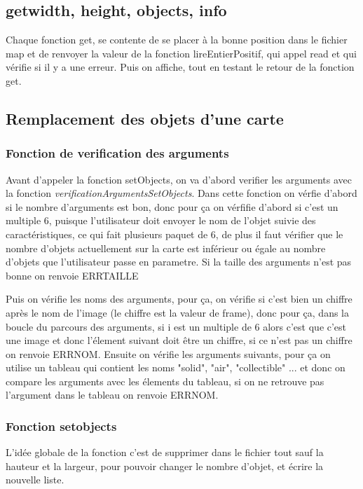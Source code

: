 \documentclass[10pt,a4paper]{article}
\begin{document}
\subsection{getwidth, height, objects, info}
    Chaque fonction get, se contente de se placer à la bonne position dans le fichier map et de renvoyer la valeur de la fonction lireEntierPositif, qui appel read et qui vérifie si il y a une erreur. Puis on affiche, tout en testant le retour de la fonction get. 
\subsection{Remplacement des objets d'une carte}
        \subsubsection{Fonction de verification des arguments}
            Avant d'appeler la fonction setObjects, on va d'abord verifier les arguments avec la fonction \textit{verificationArgumentsSetObjects}.
            Dans cette fonction on vérfie d'abord si le nombre d'arguments est bon, donc pour ça on vérfifie d'abord si c'est un multiple 6, puisque l'utilisateur doit envoyer le nom de l'objet suivie des caractéristiques, ce qui fait plusieurs paquet de 6, de plus il faut vérifier que le nombre d'objets actuellement sur la carte est inférieur ou égale au nombre d'objets que l'utilisateur passe en parametre. Si la taille des arguments n'est pas bonne on renvoie ERRTAILLE
            
            Puis on vérifie les noms des arguments, pour ça, on vérifie si c'est bien un chiffre après le nom de l'image (le chiffre est la valeur de frame), donc pour ça, dans la boucle du parcours des arguments, si i est un multiple de 6 alors c'est que c'est une image et donc l'élement suivant doit être un chiffre, si ce n'est pas un chiffre on renvoie ERRNOM.
            Ensuite on vérifie les arguments suivants, pour ça on utilise un tableau qui contient les noms "solid", "air", "collectible" ... et donc on compare les arguments avec les élements du tableau, si on ne retrouve pas l'argument dans le tableau on renvoie ERRNOM.
            
        \subsubsection{Fonction setobjects}
            L'idée globale de la fonction c'est de supprimer dans le fichier tout sauf la hauteur et la largeur, pour pouvoir changer le nombre d'objet, et écrire la nouvelle liste.
            
\end{document}

